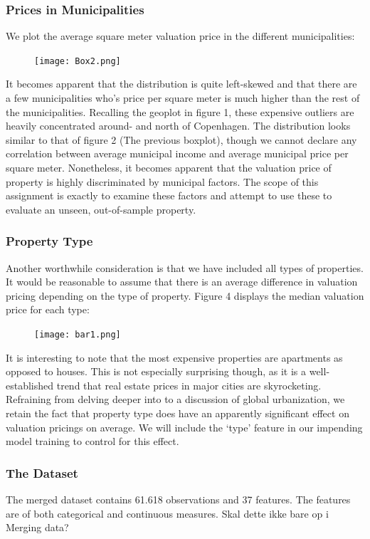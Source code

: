 \documentclass[12pt,a4paper]{article}
\begin{document}
\subsubsection{Prices in Municipalities}
We plot the average square meter valuation price in the different municipalities:
\begin{figure}[H]
  \centering
   \caption{}
   \texttt{[image: Box2.png]} 
  \label{fig:}
\end{figure}
It becomes apparent that the distribution is quite left-skewed and that there are a few municipalities who’s price per square meter is much higher than the rest of the municipalities. Recalling the geoplot in figure 1, these expensive outliers are heavily concentrated around- and north of Copenhagen. 
The distribution looks similar to that of figure 2 (The previous boxplot), though we cannot declare any correlation between average municipal income and average municipal price per square meter. Nonetheless, it becomes apparent that the valuation price of property is highly discriminated by municipal factors. The scope of this assignment is exactly to examine these factors and attempt to use these to evaluate an unseen, out-of-sample property. 

\subsubsection{Property Type}
Another worthwhile consideration is that we have included all types of properties. It would be reasonable to assume that there is an average difference in valuation pricing depending on the type of property. Figure 4 displays the median valuation price for each type:
\begin{figure}[H]
  \centering
   \caption{}
   \texttt{[image: bar1.png]} 
  \label{fig:}
\end{figure}
It is interesting to note that the most expensive properties are apartments as opposed to houses. This is not especially surprising though, as it is a well-established trend that real estate prices in major cities are skyrocketing. Refraining from delving deeper into to a discussion of global urbanization, we retain the fact that property type does have an apparently significant effect on valuation pricings on average. We will include the ‘type’ feature in our impending model training to control for this effect. 

\subsubsection{The Dataset}
The merged dataset contains 61.618 observations and 37 features.   The features are of both categorical and continuous measures. Skal dette ikke bare op i Merging data?\newline 
\end{document}
